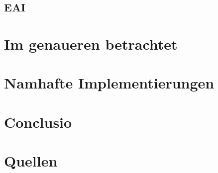 \documentclass[a4paper,12pt]{scrreprt}
\begin{document}
	\section{EAI}
		
\chapter{Im genaueren betrachtet}
	
\chapter{Namhafte Implementierungen}
	
\chapter{Conclusio}

\chapter{Quellen}
\end{document}
